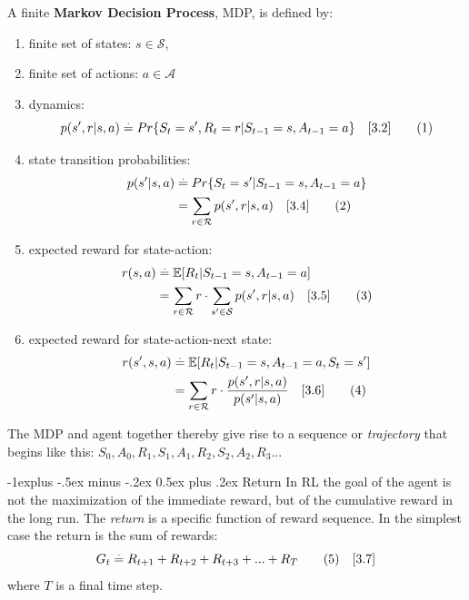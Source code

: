 \documentclass[10pt,landscape]{article}
\makeatletter
\renewcommand{\subsection}{\@startsection{subsection}{2}{0mm}%
                                {-1explus -.5ex minus -.2ex}%
                                {0.5ex plus .2ex}%
                                {\normalfont\normalsize\bfseries}}
\newcommand\numberthis{\addtocounter{equation}{1}\tag{\theequation}}
\makeatother
\begin{document}
\begin{multicols}{3}
A finite \textbf{Markov Decision Process}, MDP, is defined by:
\begin{enumerate}
    \item finite set of states:  $s \in \mathcal{S}$,
    \item finite set of actions: $a \in \mathcal{A}$
    \item dynamics:
\begin{equation}
p(s', r | s, a) \stackrel{.}{=} Pr \{S_{t} = s', R_{t} = r | \\ S_{t-1} = s, A_{t-1} = a \} \quad [3.2] \numberthis
\end{equation}
    \item state transition probabilities: 
\begin{align*}
p(s' | s, a) & \stackrel{.}{=} Pr \{S_{t} = s' | S_{t-1} = s, A_{t-1} = a \} \\
& = \sum_{r \in \mathcal{R}} p(s', r | s, a) \quad [3.4]  \numberthis
\end{align*}
    \item expected reward for state-action:
\begin{align*}
r(s, a) & \stackrel{.}{=} \mathbb{E}[ R_{t} | S_{t-1} = s, A_{t-1} = a ] \\
 & = \sum_{r \in \mathcal{R}} r \cdot \sum_{s' \in \mathcal{S}} p(s', r | s, a) \quad [3.5]  \numberthis
\end{align*}
    \item expected reward for state-action-next state: 
\begin{align*}
r(s',s, a) & \stackrel{.}{=} \mathbb{E}[ R_{t} | S_{t-1} = s, A_{t-1} = a, S_{t} = s' ] \\
& = \sum_{r \in \mathcal{R}} r \cdot \frac{p(s', r | s, a)}{p(s' | s,a)} \quad [3.6] \numberthis
\end{align*}
\end{enumerate}

The MDP and agent together thereby give rise to a sequence or \emph{trajectory} that begins like this:
$S_0,A_0,R_1,S_1,A_1,R_2,S_2,A_2,R_3...$

\subsection{Return}
In RL the goal of the agent is not the maximization of the immediate reward, but of the cumulative reward in the long run. The \emph{return} is a specific function of reward sequence. In the simplest case the return is the sum of rewards: 
\begin{equation}
G_t \stackrel{.}{=} R_{t+1} + R_{t+2} + R_{t+3} + ... +  R_{T} \numberthis \label{eq:return_1} \quad [3.7]
\end{equation}
where $T$ is a final time step. \\


\end{multicols}
\end{document}
